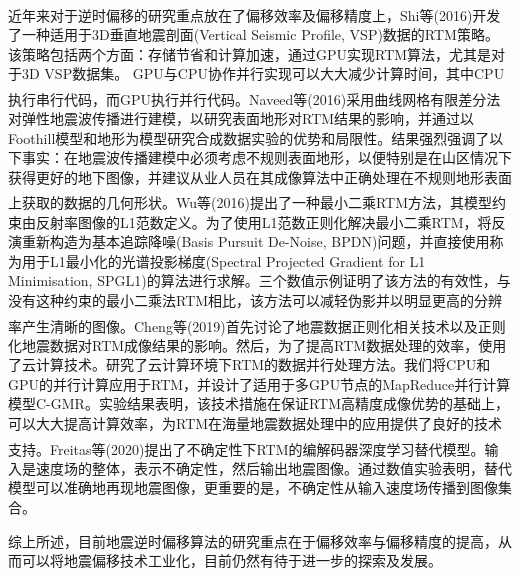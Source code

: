 \documentclass[11pt]{article}
\newcommand{\upcite}[1]{\textsuperscript{\textsuperscript{\cite{#1}}}}
\begin{document}
近年来对于逆时偏移的研究重点放在了偏移效率及偏移精度上，Shi等\upcite{ShiY2016}(2016)开发了一种适用于3D垂直地震剖面(Vertical Seismic Profile, VSP)数据的RTM策略。该策略包括两个方面：存储节省和计算加速，通过GPU实现RTM算法，尤其是对于3D VSP数据集。 GPU与CPU协作并行实现可以大大减少计算时间，其中CPU执行串行代码，而GPU执行并行代码。Naveed等\upcite{Naveed2016}(2016)采用曲线网格有限差分法对弹性地震波传播进行建模，以研究表面地形对RTM结果的影响，并通过以Foothill模型和地形为模型研究合成数据实验的优势和局限性。结果强烈强调了以下事实：在地震波传播建模中必须考虑不规则表面地形，以便特别是在山区情况下获得更好的地下图像，并建议从业人员在其成像算法中正确处理在不规则地形表面上获取的数据的几何形状。Wu等\upcite{WuD2016}(2016)提出了一种最小二乘RTM方法，其模型约束由反射率图像的L1范数定义。为了使用L1范数正则化解决最小二乘RTM，将反演重新构造为基本追踪降噪(Basis Pursuit De-Noise, BPDN)问题，并直接使用称为用于L1最小化的光谱投影梯度(Spectral Projected Gradient for L1 Minimisation, SPGL1)的算法进行求解。三个数值示例证明了该方法的有效性，与没有这种约束的最小二乘法RTM相比，该方法可以减轻伪影并以明显更高的分辨率产生清晰的图像。Cheng等\upcite{ChengC2019}(2019)首先讨论了地震数据正则化相关技术以及正则化地震数据对RTM成像结果的影响。然后，为了提高RTM数据处理的效率，使用了云计算技术。研究了云计算环境下RTM的数据并行处理方法。我们将CPU和GPU的并行计算应用于RTM，并设计了适用于多GPU节点的MapReduce并行计算模型C-GMR。实验结果表明，该技术措施在保证RTM高精度成像优势的基础上，可以大大提高计算效率，为RTM在海量地震数据处理中的应用提供了良好的技术支持。Freitas等\upcite{Freitas2020}(2020)提出了不确定性下RTM的编解码器深度学习替代模型。输入是速度场的整体，表示不确定性，然后输出地震图像。通过数值实验表明，替代模型可以准确地再现地震图像，更重要的是，不确定性从输入速度场传播到图像集合。
\par
综上所述，目前地震逆时偏移算法的研究重点在于偏移效率与偏移精度的提高，从而可以将地震偏移技术工业化，目前仍然有待于进一步的探索及发展。
\end{document}
